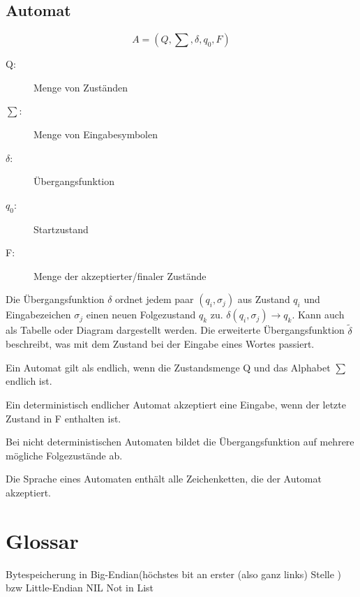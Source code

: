 \documentclass[a4paper]{scrartcl}
\begin{document}
        \subsection{Automat}
            $$A = (Q, \sum, \delta, q_0, F)$$
            \begin{description}
                \item[Q:] Menge von Zuständen
                \item[$\sum$: ] Menge von Eingabesymbolen
                \item[$\delta$: ] Übergangsfunktion
                \item[$q_0$: ] Startzustand
                \item[F: ] Menge der akzeptierter/finaler Zustände 
            \end{description}
            Die Übergangsfunktion $\delta$ ordnet jedem  paar $(q_i, \sigma_j)$ aus Zustand $q_i$ und Eingabezeichen $\sigma_j$ einen neuen Folgezustand $q_k$ zu. $\delta(q_i, \sigma_j) \rightarrow q_k$. Kann auch als Tabelle oder Diagram dargestellt werden. Die erweiterte Übergangsfunktion $\tilde{\delta}$ beschreibt, was mit dem Zustand bei der Eingabe eines Wortes passiert.

            Ein Automat gilt als endlich, wenn die Zustandsmenge Q und das Alphabet $\sum$ endlich ist.
            
            Ein deterministisch endlicher Automat akzeptiert eine Eingabe, wenn der letzte Zustand in F enthalten ist.

            Bei nicht deterministischen Automaten bildet die Übergangsfunktion auf mehrere mögliche Folgezustände ab.

            Die Sprache eines Automaten enthält alle Zeichenketten, die der Automat akzeptiert.
    \section{Glossar}
        Bytespeicherung in Big-Endian(höchstes bit an erster (also  ganz links) Stelle ) bzw Little-Endian
        NIL Not in List
\end{document}
